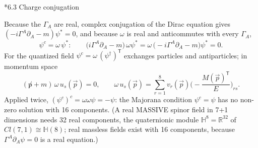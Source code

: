 \documentclass[10pt,a4paper]{article}
\makeatletter
\renewcommand\subsection{\@startsection{subsection}{2}{\z@}{-3.25ex\@plus -1ex \@minus -.2ex}{1.5ex \@plus .2ex}{\normalfont\large\bfseries\raggedright}}
\makeatother
\begin{document}
\subsection*{6.3 Charge conjugation}
Because the $\Gamma_A$ are real, complex conjugation of the Dirac equation gives $(-i\Gamma^A\partial_A-m)\psi^*=0$, and because $\omega$ is real and anticommutes with every $\Gamma_A$,
\begin{equation*}
\psi^{c}=\omega\,\psi^*:\qquad \big(i\Gamma^A\partial_A-m\big)\,\omega\psi^*=\omega\,\big(-i\Gamma^A\partial_A-m\big)\psi^*=0 .
\end{equation*}
For the quantized field $\psi^{c}=\omega\,(\psi^\dagger)^{\mathsf T}$ exchanges particles and antiparticles; in momentum space
\begin{equation*}
(\not p+m)\,\omega\,u_s(\vec p)=0,\qquad \omega\,u_s(\vec p)=\sum_{r=1}^{8}v_r(\vec p)\Big(-\frac{M(\vec p)^{\mathsf T}}{E}\Big)_{rs}.
\end{equation*}
Applied twice, $(\psi^{c})^{c}=\omega\omega\psi=-\psi$: the Majorana condition $\psi^{c}=\psi$ has no non-zero solution with 16 components. (A real MASSIVE spinor field in 7+1 dimensions needs 32 real components, the quaternionic module $\mathbb H^8=\mathbb R^{32}$ of $Cl(7,1)\cong\mathbb H(8)$; real massless fields exist with 16 components, because $\Gamma^A\partial_A\psi=0$ is a real equation.)
\end{document}
